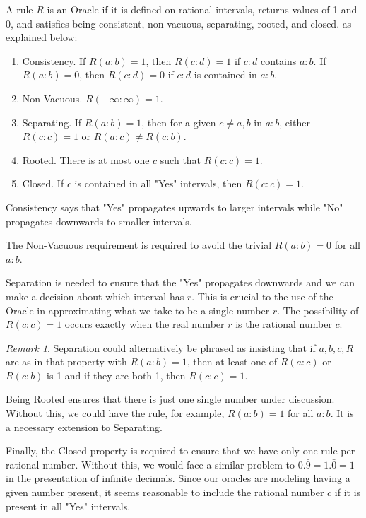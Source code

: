 \documentclass[12pt]{article}
\theoremstyle{remark}
\newtheorem{remark}{Remark}
\begin{document}
A rule $R$ is an Oracle if it is defined on rational intervals, returns values of 1
and 0, and satisfies being consistent, non-vacuous, separating, rooted, and closed. 
as explained below: 
\begin{enumerate}
    \item Consistency. If $R(a:b) = 1$, then $R(c:d) = 1$ if $c:d$ contains $a:b$. If $R(a:b)= 0$, then $R(c:d)=0$ if $c:d$ is contained in $a:b$.
    \item Non-Vacuous. $R(-\infty:\infty) = 1$.
    \item Separating. If $R(a:b)=1$, then for a given $c \neq a, b$ in $a:b$, either $R(c:c) = 1$ or $R(a:c) \neq R(c:b)$. 
    \item Rooted. There is at most one $c$ such that $R(c:c) =1$.
    \item Closed. If $c$ is contained in all "Yes" intervals, then $R(c:c) = 1$.
\end{enumerate}

Consistency says that "Yes" propagates upwards to larger intervals while "No" propagates downwards to smaller intervals. 

The Non-Vacuous requirement is required to avoid the trivial $R(a:b) = 0$ for all $a:b$. 

Separation is needed to ensure that the "Yes" propagates downwards and we can make a decision about which interval has $r$. This is crucial to the use of the Oracle in approximating what we take to be a single number $r$. The possibility of $R(c:c) = 1$ occurs exactly when the real number $r$ is the rational number $c$.

\begin{remark}
Separation could alternatively be phrased as insisting that if $a,b,c, R$ are as in that property with $R(a:b) = 1$, then at least one of $R(a:c)$ or $R(c:b)$ is 1 and if they are both 1, then $R(c:c) = 1$. 
\end{remark}


Being Rooted ensures that there is just one single number under discussion. Without this, we could have the rule, for example, $R(a:b) = 1$ for all $a:b$. It is a necessary extension to Separating. 

Finally, the Closed property is required to ensure that we have only one rule per rational number. Without this, we would face a similar problem to $0.\bar{9} = 1.\bar{0} = 1$ in the presentation of infinite decimals. Since our oracles are modeling having a given number present, it seems reasonable to include the rational number $c$ if it is present in all "Yes" intervals. 
\end{document}

